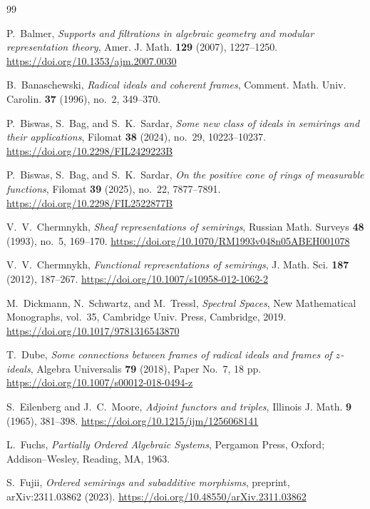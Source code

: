 \documentclass[12pt,leqno]{amsart}
\theoremstyle{definition}
\numberwithin{equation}{section}
\theoremstyle{remark}
\begin{document}
\begin{thebibliography}{99}
\sloppy

P.~Balmer,
\emph{Supports and filtrations in algebraic geometry and modular representation theory},
Amer. J. Math. \textbf{129} (2007), 1227--1250.
\url{https://doi.org/10.1353/ajm.2007.0030}

B.~Banaschewski,
\emph{Radical ideals and coherent frames},
Comment. Math. Univ. Carolin. \textbf{37} (1996), no.~2, 349--370.

P.~Biswas, S.~Bag, and S.~K.~Sardar,
\emph{Some new class of ideals in semirings and their applications},
Filomat \textbf{38} (2024), no.~29, 10223--10237.
\url{https://doi.org/10.2298/FIL2429223B}

P.~Biswas, S.~Bag, and S.~K.~Sardar,
\emph{On the positive cone of rings of measurable functions},
Filomat \textbf{39} (2025), no.~22, 7877--7891.
\url{https://doi.org/10.2298/FIL2522877B}

V.~V.~Chermnykh,
\emph{Sheaf representations of semirings},
Russian Math. Surveys \textbf{48} (1993), no.~5, 169--170.
\url{https://doi.org/10.1070/RM1993v048n05ABEH001078}

V.~V.~Chermnykh,
\emph{Functional representations of semirings},
J. Math. Sci. \textbf{187} (2012), 187--267.
\url{https://doi.org/10.1007/s10958-012-1062-2}

M.~Dickmann, N.~Schwartz, and M.~Tressl,
\emph{Spectral Spaces},
New Mathematical Monographs, vol.~35, Cambridge Univ. Press, Cambridge, 2019.
\url{https://doi.org/10.1017/9781316543870}

T.~Dube,
\emph{Some connections between frames of radical ideals and frames of $z$-ideals},
Algebra Universalis \textbf{79} (2018), Paper No.~7, 18 pp.
\url{https://doi.org/10.1007/s00012-018-0494-z}

S.~Eilenberg and J.~C.~Moore,
\emph{Adjoint functors and triples},
Illinois J. Math. \textbf{9} (1965), 381--398.
\url{https://doi.org/10.1215/ijm/1256068141}

L.~Fuchs,
\emph{Partially Ordered Algebraic Systems},
Pergamon Press, Oxford; Addison--Wesley, Reading, MA, 1963.

S.~Fujii,
\emph{Ordered semirings and subadditive morphisms},
preprint, arXiv:2311.03862 (2023).
\url{https://doi.org/10.48550/arXiv.2311.03862}


\end{thebibliography}
\end{document}
